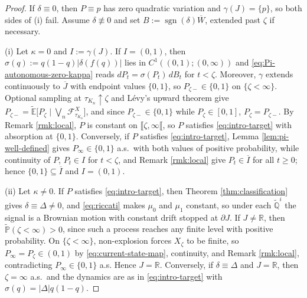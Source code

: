 \documentclass[11pt, reqno]{amsart}
\theoremstyle{plain}
\theoremstyle{remark}
\numberwithin{equation}{section}
\begin{document}
\begin{proof}
If $\delta\equiv0$, then $P\equiv p$ has zero quadratic variation and
$\gamma(J)=\{p\}$, so both sides of (i) fail. Assume $\delta\not\equiv0$ and set
$B:=\operatorname{sgn}(\delta)\overline W$, extended past $\zeta$ if necessary.

(i) Let $\kappa=0$ and $I:=\gamma(J)$. If $I=(0,1)$, then
$\sigma(q):=q(1-q)|\delta(f(q))|$ lies in $C^1((0,1);(0,\infty))$ and
\eqref{eq:Pi-autonomous-zero-kappa} reads $dP_t=\sigma(P_t)\,dB_t$ for $t<\zeta$.
Moreover, $\gamma$ extends continuously to $\overline J$ with endpoint values
$\{0,1\}$, so $P_{\zeta-}\in\{0,1\}$ on $\{\zeta<\infty\}$. Optional sampling at
$\tau_{K_n}\uparrow\zeta$ and L\'evy's upward theorem give
$P_{\zeta-}=\widetilde{\mathbb E}\bigl[P_\zeta\mid\bigvee_n\mathcal F^X_{\tau_{K_n}}\bigr]$,
and since $P_{\zeta-}\in\{0,1\}$ while $P_\zeta\in[0,1]$, $P_\zeta=P_{\zeta-}$.
By Remark \ref{rmk:local}, $P$ is constant on $\llbracket\zeta,\infty\llbracket$,
so $P$ satisfies \eqref{eq:intro-target} with absorption at $\{0,1\}$. Conversely,
if $P$ satisfies \eqref{eq:intro-target}, Lemma \ref{lem:pi-well-defined} gives
$P_\infty\in\{0,1\}$ a.s.\ with both values of positive probability, while
continuity of $P$, $P_t\in I$ for $t<\zeta$, and Remark \ref{rmk:local} give
$P_t\in\overline I$ for all $t\geq0$; hence $\{0,1\}\subseteq\overline I$ and
$I=(0,1)$.

(ii) Let $\kappa\neq0$. If $P$ satisfies \eqref{eq:intro-target}, then
Theorem \ref{thm:classification} gives $\delta\equiv\Delta\neq0$, and
\eqref{eq:riccati} makes $\mu_0$ and $\mu_1$ constant, so under each
$\widetilde{\mathbb Q}^i$ the signal is a Brownian motion with constant drift
stopped at $\partial J$. If $J\neq\mathbb R$, then
$\widetilde{\mathbb P}(\zeta<\infty)>0$, since such a process reaches any finite
level with positive probability. On $\{\zeta<\infty\}$, non-explosion forces
$X_\zeta$ to be finite, so
$P_\infty=P_\zeta\in(0,1)$ by \eqref{eq:current-state-map}, continuity, and Remark
\ref{rmk:local}, contradicting $P_\infty\in\{0,1\}$ a.s. Hence $J=\mathbb R$.
Conversely, if $\delta\equiv\Delta$ and $J=\mathbb R$, then $\zeta=\infty$ a.s.\
and the dynamics are as in \eqref{eq:intro-target} with
$\sigma(q)=|\Delta|q(1-q)$.
\end{proof}

%
%
%
%
%
%
%
\color{black}

%
%
%
%
%
%
%
%
%
%

%
%
%
%
%
%
%
%
%
%
%
%
%

%
    
\end{document}
